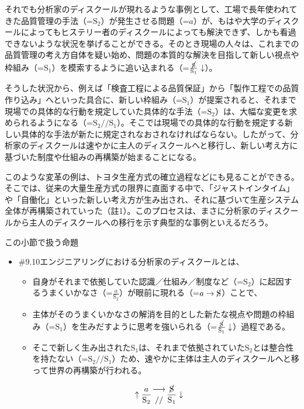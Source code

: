 それでも分析家のディスクールが現れるような事例として、工場で長年使われてきた品質管理の手法（=\(\textrm{S}_2\)）が発生させる問題（=\(a\)）が、もはや大学のディスクールによってもヒステリー者のディスクールによっても解決できず、しかも看過できないような状況を挙げることができる。そのとき現場の人々は、これまでの品質管理の考え方自体を疑い始め、問題の本質的な解決を目指して新しい視点や枠組み（=\(\textrm{S}_1\)）を模索するように追い込まれる（=\(\frac{\cancel{\textrm{S}}}{\textrm{S}_1}\downarrow\)）。

そうした状況から、例えば「検査工程による品質保証」から「製作工程での品質作り込み」へといった具合に、新しい枠組み（=\(\textrm{S}_1\)）が提案されると、それまで現場での具体的な行動を規定していた具体的な手法（=\(\textrm{S}_2\)）は、大幅な変更を求められるようになる（=\(\textrm{S}_2//\textrm{S}_1\)）。そこでは現場での具体的な行動を規定する新しい具体的な手法が新たに規定されなおされなければならない。したがって、分析家のディスクールは速やかに主人のディスクールへと移行し、新しい考え方に基づいた制度や仕組みの再構築が始まることになる。

このような変革の例は、トヨタ生産方式の確立過程などにも見ることができる。そこでは、従来の大量生産方式の限界に直面する中で、「ジャストインタイム」や「自働化」といった新しい考え方が生み出され、それに基づいて生産システム全体が再構築されていった（註1）。このプロセスは、まさに分析家のディスクールから主人のディスクールへの移行を示す典型的な事例といえるだろう。

\begin{note}{}{この小節で扱う命題}
  \begin{itemize}
    \tightlist
    \item{\#9.10}エンジニアリングにおける分析家のディスクールとは、
      \begin{itemize}
        \tightlist
        \item 自身がそれまで依拠していた認識／仕組み／制度など（=$\textrm{S}_2$）に起因するうまくいかなさ（=$\frac{a}{\textrm{S}_2}$）が眼前に現れる（=$a\rightarrow\cancel{\textrm{S}}$）ことで、
        \item 主体がそのうまくいかなさの解消を目的とした新たな視点や問題の枠組み（=$\textrm{S}_1$）を生みだすように思考を強いられる（=$\frac{\cancel{\textrm{S}}}{\textrm{S}_1}\downarrow$）過程である。
        \item そこで新しく生み出された$\textrm{S}_1$は、それまで依拠されていた$\textrm{S}_2$とは整合性を持たない（=$\textrm{S}_2//\textrm{S}_1$）ため、速やかに主体は主人のディスクールへと移って世界の再構築が行われる。
      \end{itemize}

$$
\uparrow\frac{a}{\mathrm{S_2}}\genfrac{}{}{0pt}{}{\longrightarrow}{//}\frac{\cancel{\textrm{S}}}{\mathrm{S_1}}\downarrow
$$
  \end{itemize}
\end{note}

